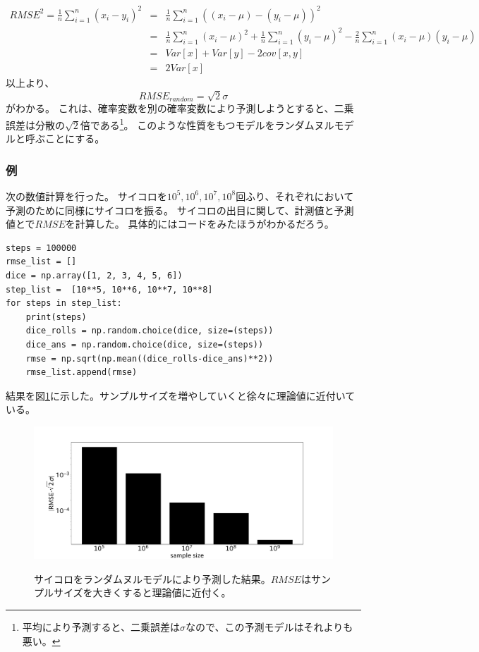\begin{eqnarray*}
 RMSE^2=\frac{1}{n}\sum_{i=1}^n (x_i-y_i)^2 &=& \frac{1}{n}\sum_{i=1}^n \left( (x_i-\mu)-(y_i-\mu)\right) ^2\\
 &=& \frac{1}{n}\sum_{i=1}^n (x_i-\mu)^2+\frac{1}{n}\sum_{i=1}^n(y_i-\mu)^2-\frac{2}{n}\sum_{i=1}^n(x_i-\mu)(y_i-\mu) \\
 &=& Var[x]+Var[y]-2cov[x,y] \\
 &=& 2Var[x]
\end{eqnarray*}
 以上より、
\begin{equation*}
 RMSE_{random} = \sqrt{2}\sigma
\end{equation*}
がわかる。
これは、確率変数を別の確率変数により予測しようとすると、二乗誤差は分散の$\sqrt{2}$倍である\footnote{平均により予測すると、二乗誤差は$\sigma$なので、この予測モデルはそれよりも悪い。}。
このような性質をもつモデルをランダムヌルモデルと呼ぶことにする。

\subsubsection{例}
次の数値計算を行った。
サイコロを$10^5,10^6,10^7,10^8$回ふり、それぞれにおいて予測のために同様にサイコロを振る。
サイコロの出目に関して、計測値と予測値とで$RMSE$を計算した。
具体的にはコードをみたほうがわかるだろう。

\begin{lstlisting}
steps = 100000
rmse_list = []
dice = np.array([1, 2, 3, 4, 5, 6])
step_list =  [10**5, 10**6, 10**7, 10**8]
for steps in step_list:
    print(steps)
    dice_rolls = np.random.choice(dice, size=(steps))
    dice_ans = np.random.choice(dice, size=(steps))
    rmse = np.sqrt(np.mean((dice_rolls-dice_ans)**2))
    rmse_list.append(rmse)
\end{lstlisting}

結果を図\ref{fig:random_hit}に示した。サンプルサイズを増やしていくと徐々に理論値に近付いている。
\begin{figure}
 \begin{center}
  \includegraphics[width=15cm]{./image/12_/random_hit.pdf}
  \label{fig:random_hit}
 \caption{サイコロをランダムヌルモデルにより予測した結果。$RMSE$はサンプルサイズを大きくすると理論値に近付く。}
 \end{center}
\end{figure}

